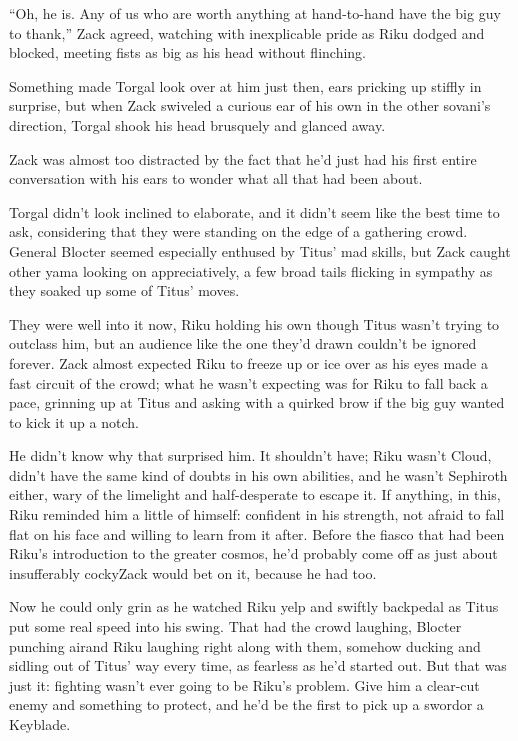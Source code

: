 ``Oh, he is. Any of us who are worth anything at hand-to-hand have the big guy to thank,'' Zack agreed, watching with inexplicable pride as Riku dodged and blocked, meeting fists as big as his head without flinching.

Something made Torgal look over at him just then, ears pricking up stiffly in surprise, but when Zack swiveled a curious ear of his own in the other sovani's direction, Torgal shook his head brusquely and glanced away.

Zack was almost too distracted by the fact that he'd just had his first entire conversation with his ears to wonder what all that had been about.

Torgal didn't look inclined to elaborate, and it didn't seem like the best time to ask, considering that they were standing on the edge of a gathering crowd. General Blocter seemed especially enthused by Titus' mad skills, but Zack caught other yama looking on appreciatively, a few broad tails flicking in sympathy as they soaked up some of Titus' moves.

They were well into it now, Riku holding his own though Titus wasn't trying to outclass him, but an audience like the one they'd drawn couldn't be ignored forever. Zack almost expected Riku to freeze up or ice over as his eyes made a fast circuit of the crowd; what he wasn't expecting was for Riku to fall back a pace, grinning up at Titus and asking with a quirked brow if the big guy wanted to kick it up a notch.

He didn't know why that surprised him. It shouldn't have; Riku wasn't Cloud, didn't have the same kind of doubts in his own abilities, and he wasn't Sephiroth either, wary of the limelight and half-desperate to escape it. If anything, in this, Riku reminded him a little of himself: confident in his strength, not afraid to fall flat on his face and willing to learn from it after. Before the fiasco that had been Riku's introduction to the greater cosmos, he'd probably come off as just about insufferably cocky\textemdash Zack would bet on it, because he had too.

Now he could only grin as he watched Riku yelp and swiftly backpedal as Titus put some real speed into his swing. That had the crowd laughing, Blocter punching air\textemdash and Riku laughing right along with them, somehow ducking and sidling out of Titus' way every time, as fearless as he'd started out. But that was just it: fighting wasn't ever going to be Riku's problem. Give him a clear-cut enemy and something to protect, and he'd be the first to pick up a sword\textemdash or a Keyblade.

